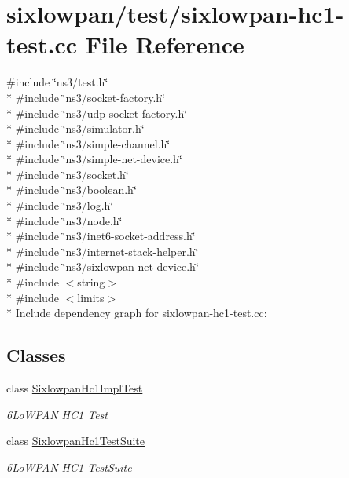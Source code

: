\hypertarget{sixlowpan-hc1-test_8cc}{}\section{sixlowpan/test/sixlowpan-\/hc1-\/test.cc File Reference}
\label{sixlowpan-hc1-test_8cc}
{\ttfamily \#include \char`\"{}ns3/test.\+h\char`\"{}}\\*
{\ttfamily \#include \char`\"{}ns3/socket-\/factory.\+h\char`\"{}}\\*
{\ttfamily \#include \char`\"{}ns3/udp-\/socket-\/factory.\+h\char`\"{}}\\*
{\ttfamily \#include \char`\"{}ns3/simulator.\+h\char`\"{}}\\*
{\ttfamily \#include \char`\"{}ns3/simple-\/channel.\+h\char`\"{}}\\*
{\ttfamily \#include \char`\"{}ns3/simple-\/net-\/device.\+h\char`\"{}}\\*
{\ttfamily \#include \char`\"{}ns3/socket.\+h\char`\"{}}\\*
{\ttfamily \#include \char`\"{}ns3/boolean.\+h\char`\"{}}\\*
{\ttfamily \#include \char`\"{}ns3/log.\+h\char`\"{}}\\*
{\ttfamily \#include \char`\"{}ns3/node.\+h\char`\"{}}\\*
{\ttfamily \#include \char`\"{}ns3/inet6-\/socket-\/address.\+h\char`\"{}}\\*
{\ttfamily \#include \char`\"{}ns3/internet-\/stack-\/helper.\+h\char`\"{}}\\*
{\ttfamily \#include \char`\"{}ns3/sixlowpan-\/net-\/device.\+h\char`\"{}}\\*
{\ttfamily \#include $<$string$>$}\\*
{\ttfamily \#include $<$limits$>$}\\*
Include dependency graph for sixlowpan-\/hc1-\/test.cc\+:
\subsection*{Classes}
\begin{DoxyCompactItemize}
\item 
class \hyperlink{classSixlowpanHc1ImplTest}{Sixlowpan\+Hc1\+Impl\+Test}
\begin{DoxyCompactList}\small\item\em 6\+Lo\+W\+P\+AN H\+C1 Test \end{DoxyCompactList}\item 
class \hyperlink{classSixlowpanHc1TestSuite}{Sixlowpan\+Hc1\+Test\+Suite}
\begin{DoxyCompactList}\small\item\em 6\+Lo\+W\+P\+AN H\+C1 Test\+Suite \end{DoxyCompactList}\end{DoxyCompactItemize}
